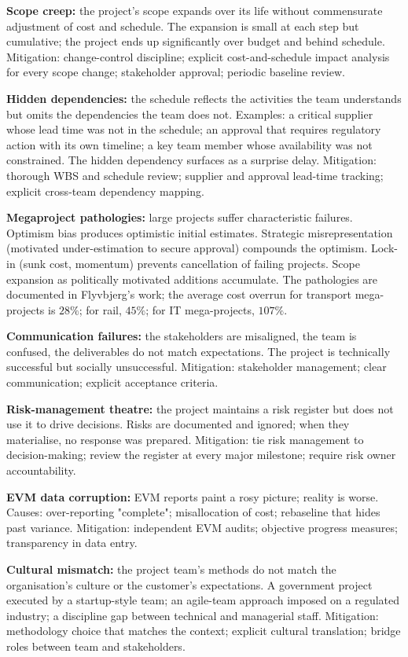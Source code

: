 \textbf{Scope creep:} the project's scope expands over its life without commensurate adjustment of cost and schedule. The expansion is small at each step but cumulative; the project ends up significantly over budget and behind schedule. Mitigation: change-control discipline; explicit cost-and-schedule impact analysis for every scope change; stakeholder approval; periodic baseline review.

\textbf{Hidden dependencies:} the schedule reflects the activities the team understands but omits the dependencies the team does not. Examples: a critical supplier whose lead time was not in the schedule; an approval that requires regulatory action with its own timeline; a key team member whose availability was not constrained. The hidden dependency surfaces as a surprise delay. Mitigation: thorough WBS and schedule review; supplier and approval lead-time tracking; explicit cross-team dependency mapping.

\textbf{Megaproject pathologies:} large projects suffer characteristic failures. Optimism bias produces optimistic initial estimates. Strategic misrepresentation (motivated under-estimation to secure approval) compounds the optimism. Lock-in (sunk cost, momentum) prevents cancellation of failing projects. Scope expansion as politically motivated additions accumulate. The pathologies are documented in Flyvbjerg's work; the average cost overrun for transport mega-projects is $28\%$; for rail, $45\%$; for IT mega-projects, $107\%$.

\textbf{Communication failures:} the stakeholders are misaligned, the team is confused, the deliverables do not match expectations. The project is technically successful but socially unsuccessful. Mitigation: stakeholder management; clear communication; explicit acceptance criteria.

\textbf{Risk-management theatre:} the project maintains a risk register but does not use it to drive decisions. Risks are documented and ignored; when they materialise, no response was prepared. Mitigation: tie risk management to decision-making; review the register at every major milestone; require risk owner accountability.

\textbf{EVM data corruption:} EVM reports paint a rosy picture; reality is worse. Causes: over-reporting "complete"; misallocation of cost; rebaseline that hides past variance. Mitigation: independent EVM audits; objective progress measures; transparency in data entry.

\textbf{Cultural mismatch:} the project team's methods do not match the organisation's culture or the customer's expectations. A government project executed by a startup-style team; an agile-team approach imposed on a regulated industry; a discipline gap between technical and managerial staff. Mitigation: methodology choice that matches the context; explicit cultural translation; bridge roles between team and stakeholders.

